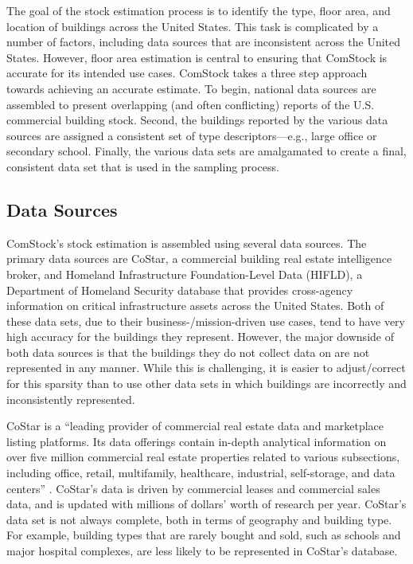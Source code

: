 The goal of the stock estimation process is to identify the type, floor area, and location of buildings across the United States. This task is complicated by a number of factors, including data sources that are inconsistent across the United States. However, floor area estimation is central to ensuring that ComStock is accurate for its intended use cases. ComStock takes a three step approach towards achieving an accurate estimate. To begin, national data sources are assembled to present overlapping (and often conflicting) reports of the U.S. commercial building stock. Second, the buildings reported by the various data sources are assigned a consistent set of type descriptors---e.g., large office or secondary school. Finally, the various data sets are amalgamated to create a final, consistent data set that is used in the sampling process.

\subsection{Data Sources}\label{sec:data_sources}

ComStock's stock estimation is assembled using several data sources. The primary data sources are CoStar, a commercial building real estate intelligence broker, and Homeland Infrastructure Foundation-Level Data (HIFLD), a Department of Homeland Security database that provides cross-agency information on critical infrastructure assets across the United States. Both of these data sets, due to their business-/mission-driven use cases, tend to have very high accuracy for the buildings they represent. However, the major downside of both data sources is that the buildings they do not collect data on are not represented in any manner. While this is challenging, it is easier to adjust/correct for this sparsity than to use other data sets in which buildings are incorrectly and inconsistently represented.

CoStar is a ``leading provider of commercial real estate data and marketplace listing platforms. Its data offerings contain in-depth analytical information on over five million commercial real estate properties related to various subsections, including office, retail, multifamily, healthcare, industrial, self-storage, and data centers'' \citep{costar_10k}. CoStar's data is driven by commercial leases and commercial sales data, and is updated with millions of dollars' worth of research per year. CoStar's data set is not always complete, both in terms of geography and building type. For example, building types that are rarely bought and sold, such as schools and major hospital complexes, are less likely to be represented in CoStar's database.

